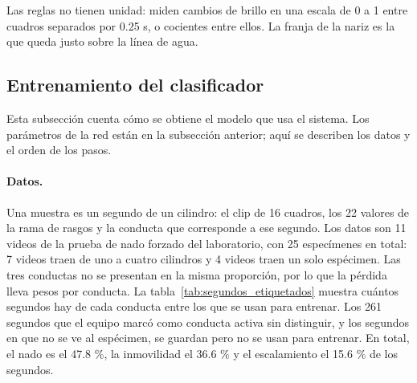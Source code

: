 Las reglas no tienen unidad: miden cambios de brillo en una escala de 0 a 1 entre cuadros separados por 0.25 s, o
cocientes entre ellos. La franja de la nariz es la que queda justo sobre la línea de agua.

\subsection{Entrenamiento del clasificador}
\label{sec:entrenamiento}

Esta subsección cuenta cómo se obtiene el modelo que usa el sistema. Los parámetros de la red están en la subsección
anterior; aquí se describen los datos y el orden de los pasos.

\paragraph{Datos.} Una muestra es un segundo de un cilindro: el clip de 16 cuadros, los 22 valores de la rama de
rasgos y la conducta que corresponde a ese segundo. Los datos son 11 videos de la prueba de nado forzado del
laboratorio, con 25 especímenes en total: 7 videos traen de uno a cuatro cilindros y 4 videos traen un solo
espécimen. Las tres conductas no se presentan en la misma proporción, por lo que la pérdida lleva pesos por
conducta. La tabla~\ref{tab:segundos_etiquetados} muestra cuántos segundos hay de cada conducta entre los que se usan
para entrenar. Los 261 segundos que el equipo marcó como conducta activa sin distinguir, y los segundos en que no se ve
al espécimen, se guardan pero no se usan para entrenar. En total, el nado es el 47.8 \%, la inmovilidad el 36.6 \% y el escalamiento el 15.6 \% de los segundos.

